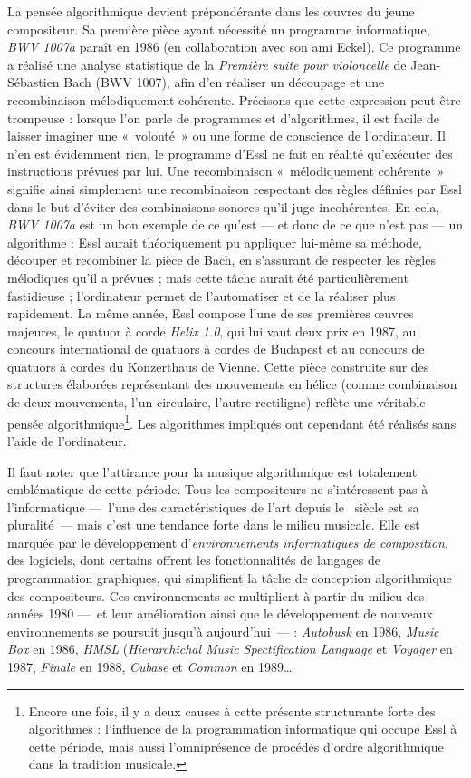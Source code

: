 \documentclass[a4paper,12pt]{article}
\newcommand{\guill}[1]{«~#1~»}
\begin{document}
La pensée algorithmique devient prépondérante dans les œuvres du jeune compositeur. Sa première pièce ayant nécessité un programme informatique, \emph{BWV 1007a} paraît en 1986 (en collaboration avec son ami Eckel). Ce programme a réalisé une analyse statistique de la \emph{Première suite pour violoncelle} de Jean-Sébastien Bach (BWV 1007), afin d'en réaliser un découpage et une recombinaison mélodiquement cohérente. Précisons que cette expression peut être trompeuse : lorsque l'on parle de programmes et d'algorithmes, il est facile de laisser imaginer une \guill{volonté} ou une forme de conscience de l'ordinateur. Il n'en est évidemment rien, le programme d'Essl ne fait en réalité qu'exécuter des instructions prévues par lui. Une recombinaison \guill{mélodiquement cohérente} signifie ainsi simplement une recombinaison respectant des règles définies par Essl dans le but d'éviter des combinaisons sonores qu'il juge incohérentes. En cela, \emph{BWV 1007a} est un bon exemple de ce qu'est --- et donc de ce que n'est pas --- un algorithme : Essl aurait théoriquement pu appliquer lui-même sa méthode, découper et recombiner la pièce de Bach, en s'assurant de respecter les règles mélodiques qu'il a prévues ; mais cette tâche aurait été particulièrement fastidieuse ; l'ordinateur permet de l'automatiser et de la réaliser plus rapidement. La même année, Essl compose l'une de ses premières œuvres majeures, le quatuor à corde \emph{Helix 1.0}, qui lui vaut deux prix en 1987, au concours international de quatuors à cordes de Budapest et au concours    de quatuors à cordes du Konzerthaus de Vienne. Cette pièce construite sur des structures élaborées représentant des mouvements en hélice (comme combinaison de deux mouvements, l'un circulaire, l'autre rectiligne) reflète une véritable pensée algorithmique\footnote{Encore une fois, il y a deux causes à cette présente structurante forte des algorithmes : l'influence de la programmation informatique qui occupe Essl à cette période, mais aussi l'omniprésence de procédés d'ordre algorithmique dans la tradition musicale.}. Les algorithmes impliqués ont cependant été réalisés sans l'aide de l'ordinateur.

Il faut noter que l'attirance pour la musique algorithmique est totalement emblématique de cette période. Tous les compositeurs ne s'intéressent pas à l'informatique ---~l'une des caractéristiques de l'art depuis le \XXe~siècle est sa pluralité~--- mais c'est une tendance forte dans le milieu musicale. Elle est marquée par le développement d'\emph{environnements informatiques de composition}, des logiciels, dont certains offrent les fonctionnalités de langages de programmation graphiques, qui simplifient la tâche de conception algorithmique des compositeurs. Ces environnements se multiplient à partir du milieu des années 1980 ---~et leur amélioration ainsi que le développement de nouveaux environnements se poursuit jusqu'à aujourd'hui~--- : \emph{Autobusk} en 1986, \emph{Music Box} en 1986, \emph{HMSL} (\emph{Hierarchichal Music Spectification Language} et \emph{Voyager} en 1987, \emph{Finale} en 1988, \emph{Cubase} et \emph{Common} en 1989\dots
\end{document}
